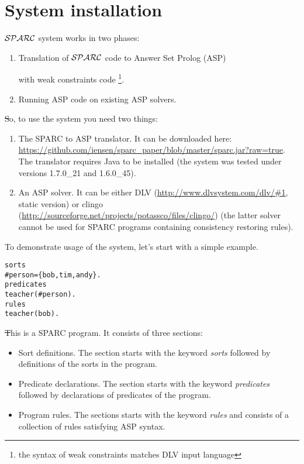 \documentclass[12pt, letterpaper]{article}
\begin{document}
\section{System installation}
${\cal SPARC}$ system  works in two phases:
\begin{enumerate}
\item Translation of ${\cal SPARC}$ code to Answer Set Prolog (ASP) \cite{gelfond1991classical}

 with weak constraints\cite{buccafurri1997strong} code 
\footnote{the syntax of weak constraints matches DLV input language}.
\item Running ASP code on existing ASP solvers.
\end{enumerate}

\st So, to use the system you need two things:
\begin{enumerate}
\item The SPARC to ASP translator. It can be downloaded here: \url{https://github.com/iensen/sparc_paper/blob/master/sparc.jar?raw=true}.
The translator requires Java to be installed (the system was tested under versions 1.7.0\_21 and 1.6.0\_45).
\item An ASP solver. It can be either DLV (\url{http://www.dlvsystem.com/dlv/#1}, static version) or clingo (\url{http://sourceforge.net/projects/potassco/files/clingo/}) (the latter solver cannot be used for SPARC programs containing consistency restoring rules).
\end{enumerate}

To demonstrate usage of the system, let's start with a simple example.
\begin{verbatim}
sorts
#person={bob,tim,andy}.
predicates
teacher(#person).
rules
teacher(bob).
\end{verbatim}

\st This is a SPARC program. It consists of three sections:
\begin{itemize}
 \item Sort definitions. The section starts with the keyword \textit{sorts} followed by definitions of the sorts in the program.
 \item Predicate declarations. The section starts with the keyword \textit{predicates} followed by declarations of predicates of the program.
 \item Program rules. The sections starts with the keyword \textit{rules}  and consists of a collection of rules satisfying ASP syntax.
\end{itemize}
\end{document}
